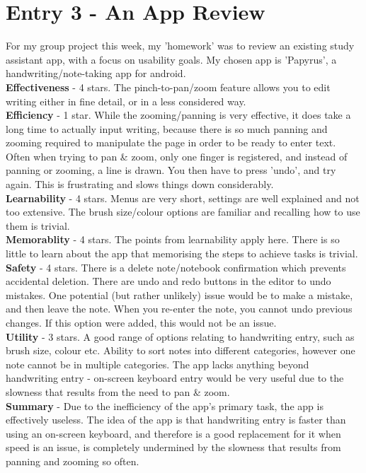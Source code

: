 \documentclass{article}
\begin{document}
\section*{Entry 3 - An App Review}

\noindent For my group project this week, my 'homework' was to review an existing study assistant app, with a focus on usability goals. My chosen app is 'Papyrus', a handwriting/note-taking app for android.
\\\indent \textbf{Effectiveness} - 4 stars. The pinch-to-pan/zoom feature allows you to edit writing either in fine detail, or in a less considered way.
\\\indent \textbf{Efficiency} - 1 star. While the zooming/panning is very effective, it does take a long time to actually input writing, because there is so much panning and zooming required to manipulate the page in order to be ready to enter text. Often when trying to pan \& zoom, only one finger is registered, and instead of panning or zooming, a line is drawn. You then have to press 'undo', and try again. This is frustrating and slows things down considerably.
\\\indent \textbf{Learnability} - 4 stars. Menus are very short, settings are well explained and not too extensive. The brush size/colour options are familiar and recalling how to use them is trivial.
\\\indent \textbf{Memorablity} - 4 stars. The points from learnability apply here. There is so little to learn about the app that memorising the steps to achieve tasks is trivial.
\\\indent \textbf{Safety} - 4 stars. There is a delete note/notebook confirmation which prevents accidental deletion. There are undo and redo buttons in the editor to undo mistakes. One potential (but rather unlikely) issue would be to make a mistake, and then leave the note. When you re-enter the note, you cannot undo previous changes. If this option were added, this would not be an issue.
\\\indent \textbf{Utility} - 3 stars. A good range of options relating to handwriting entry, such as brush size, colour etc. Ability to sort notes into different categories, however one note cannot be in multiple categories. The app lacks anything beyond handwriting entry - on-screen keyboard entry would be very useful due to the slowness that results from the need to pan \& zoom.
\\\indent \textbf{Summary} - Due to the inefficiency of the app's primary task, the app is effectively useless. The idea of the app is that handwriting entry is faster than using an on-screen keyboard, and therefore is a good replacement for it when speed is an issue, is completely undermined by the slowness that results from panning and zooming so often.
\end{document}
